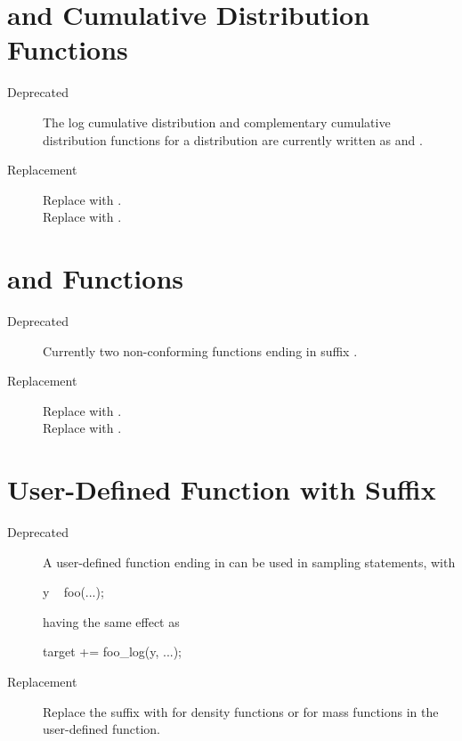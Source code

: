 \section{ and  Cumulative Distribution
  Functions}

\begin{description}
\item[Deprecated]
The log cumulative distribution and complementary cumulative
distribution functions for a distribution  are currently
written as  and .
\item[Replacement]
Replace  with .
\\[4pt]
Replace  with .
\end{description}

\section{ and  Functions}

\begin{description}
\item[Deprecated]  Currently two non-conforming functions ending in
  suffix .
\item[Replacement] Replace  with
  .
\\[4pt]
Replace  with .
\end{description}

\section{User-Defined Function with  Suffix}

\begin{description}
\item[Deprecated] A user-defined function ending in  can
  be used in sampling statements, with
%
\begin{stancode}
y ~ foo(...);
\end{stancode}
%
having the same effect as
%
\begin{stancode}
target += foo_log(y, ...);
\end{stancode}
\item[Replacement]
Replace the  suffix with  for
density functions or  for mass functions in the
user-defined function.
\end{description}

